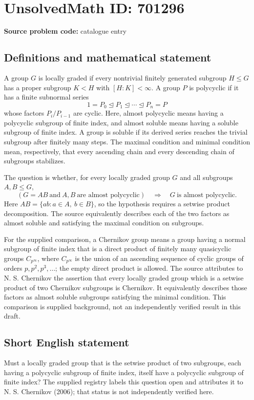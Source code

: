 \documentclass[11pt]{article}
\begin{document}
\section*{UnsolvedMath ID: 701296}
\textbf{Source problem code:} catalogue entry
\subsection{Definitions and mathematical statement}
A group \(G\) is locally graded if every nontrivial finitely generated subgroup \(H\leq G\) has a proper subgroup \(K<H\) with \([H:K]<\infty\). A group \(P\) is polycyclic if it has a finite subnormal series
\[
1=P_0\trianglelefteq P_1\trianglelefteq\cdots\trianglelefteq P_n=P
\]
whose factors \(P_i/P_{i-1}\) are cyclic. Here, almost polycyclic means having a polycyclic subgroup of finite index, and almost soluble means having a soluble subgroup of finite index. A group is soluble if its derived series reaches the trivial subgroup after finitely many steps. The maximal condition and minimal condition mean, respectively, that every ascending chain and every descending chain of subgroups stabilizes.

The question is whether, for every locally graded group \(G\) and all subgroups \(A,B\leq G\),
\[
\left(G=AB\ \text{and}\ A,B\ \text{are almost polycyclic}\right)
\quad\Longrightarrow\quad
G\ \text{is almost polycyclic}.
\]
Here \(AB=\{ab:a\in A,\ b\in B\}\), so the hypothesis requires a setwise product decomposition. The source equivalently describes each of the two factors as almost soluble and satisfying the maximal condition on subgroups.

For the supplied comparison, a Chernikov group means a group having a normal subgroup of finite index that is a direct product of finitely many quasicyclic groups \(C_{p^\infty}\), where \(C_{p^\infty}\) is the union of an ascending sequence of cyclic groups of orders \(p,p^2,p^3,\ldots\); the empty direct product is allowed. The source attributes to N. S. Chernikov the assertion that every locally graded group which is a setwise product of two Chernikov subgroups is Chernikov. It equivalently describes those factors as almost soluble subgroups satisfying the minimal condition. This comparison is supplied background, not an independently verified result in this draft.
\subsection{Short English statement}
Must a locally graded group that is the setwise product of two subgroups, each having a polycyclic subgroup of finite index, itself have a polycyclic subgroup of finite index? The supplied registry labels this question open and attributes it to N. S. Chernikov (2006); that status is not independently verified here.
\end{document}
